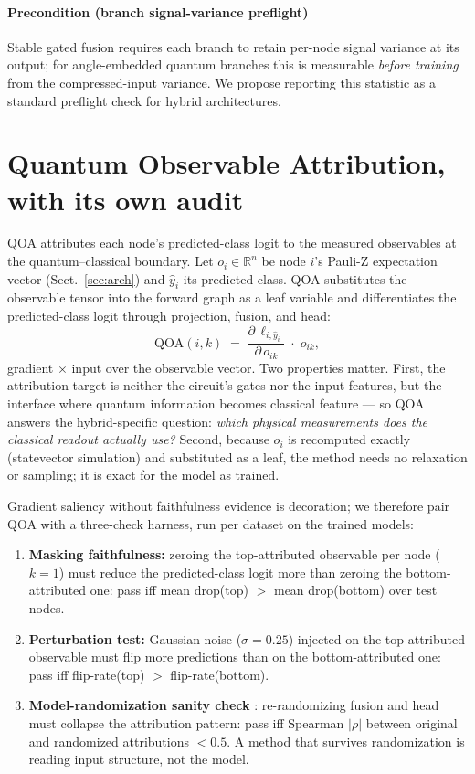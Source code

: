\documentclass[pdflatex,sn-mathphys-num]{sn-jnl}
\begin{document}
\paragraph{Precondition (branch signal-variance preflight)} Stable gated fusion requires each branch to retain per-node signal variance at its output; for angle-embedded quantum branches this is measurable \emph{before training} from the compressed-input variance. We propose reporting this statistic as a standard preflight check for hybrid architectures.

\section{Quantum Observable Attribution, with its own audit}\label{sec:qoa}

QOA attributes each node's predicted-class logit to the measured observables at the quantum--classical boundary. Let $o_i \in \mathbb{R}^n$ be node $i$'s Pauli-Z expectation vector (Sect.~\ref{sec:arch}) and $\hat{y}_i$ its predicted class. QOA substitutes the observable tensor into the forward graph as a leaf variable and differentiates the predicted-class logit through projection, fusion, and head:
\begin{equation}
\mathrm{QOA}(i,k) \;=\; \frac{\partial\, \ell_{i,\hat{y}_i}}{\partial\, o_{ik}}\; \cdot\; o_{ik},
\end{equation}
gradient $\times$ input over the observable vector. Two properties matter. First, the attribution target is neither the circuit's gates \cite{heese2025shapley} nor the input features, but the interface where quantum information becomes classical feature --- so QOA answers the hybrid-specific question: \emph{which physical measurements does the classical readout actually use?} Second, because $o_i$ is recomputed exactly (statevector simulation) and substituted as a leaf, the method needs no relaxation or sampling; it is exact for the model as trained.

Gradient saliency without faithfulness evidence is decoration; we therefore pair QOA with a three-check harness, run per dataset on the trained models:
\begin{enumerate}
\item \textbf{Masking faithfulness:} zeroing the top-attributed observable per node ($k=1$) must reduce the predicted-class logit more than zeroing the bottom-attributed one: pass iff mean drop(top) $>$ mean drop(bottom) over test nodes.
\item \textbf{Perturbation test:} Gaussian noise ($\sigma=0.25$) injected on the top-attributed observable must flip more predictions than on the bottom-attributed one: pass iff flip-rate(top) $>$ flip-rate(bottom).
\item \textbf{Model-randomization sanity check} \cite{adebayo2018sanity}: re-randomizing fusion and head must collapse the attribution pattern: pass iff Spearman $|\rho|$ between original and randomized attributions $< 0.5$. A method that survives randomization is reading input structure, not the model.
\end{enumerate}
\end{document}
